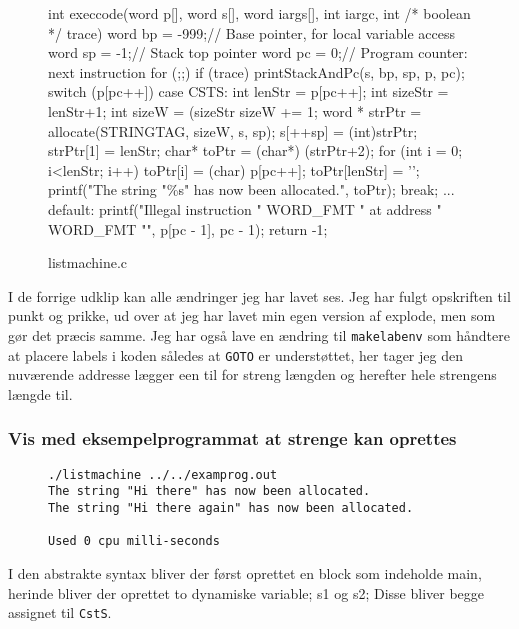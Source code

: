 \begin{figure}[!ht]
\begin{ccode}
int execcode(word p[], word s[], word iargs[], int iargc, int /* boolean */ trace) {
  word bp = -999;// Base pointer, for local variable access 
  word sp = -1;// Stack top pointer
  word pc = 0;// Program counter: next instruction
  for (;;) {
    if (trace)
      printStackAndPc(s, bp, sp, p, pc);
    switch (p[pc++]) {
    case CSTS:{
      int lenStr = p[pc++];
      int sizeStr = lenStr+1;
      int sizeW = (sizeStr%
      sizeW += 1;
      word * strPtr = allocate(STRINGTAG, sizeW, s, sp);
      s[++sp] = (int)strPtr;
      strPtr[1] = lenStr;
      char* toPtr = (char*) (strPtr+2);
      for (int i = 0; i<lenStr; i++)
        toPtr[i] = (char) p[pc++];
      toPtr[lenStr] = '\0';
      printf("The string "\%s" has now been allocated.\n", toPtr);
    }break;
    ...
    default:
      printf("Illegal instruction " WORD_FMT " at address " WORD_FMT "\n",
	     p[pc - 1], pc - 1);
      return -1;
    }
  }
}
\end{ccode}
\caption{listmachine.c}\label{fig:2016:listmachine}
\end{figure}
\newpage
\noindent I de forrige udklip kan alle ændringer jeg har lavet ses. Jeg har fulgt opskriften til punkt og prikke, ud over at jeg har lavet min egen version af explode, men som gør det præcis samme. Jeg har også lave en ændring til \Verb|makelabenv| som håndtere at placere labels i koden således at \Verb|GOTO| er understøttet, her tager jeg den nuværende addresse lægger een til for streng længden og herefter hele strengens længde til.
\subsubsection{Vis med eksempelprogrammat at strenge kan oprettes}
\begin{figure}
\begin{Verbatim}
./listmachine ../../examprog.out 
The string "Hi there" has now been allocated.
The string "Hi there again" has now been allocated.

Used 0 cpu milli-seconds
\end{Verbatim}
\end{figure}
I den abstrakte syntax bliver der først oprettet en block som indeholde main, herinde bliver der oprettet to dynamiske variable; s1 og s2; Disse bliver begge assignet til \Verb|CstS|.
